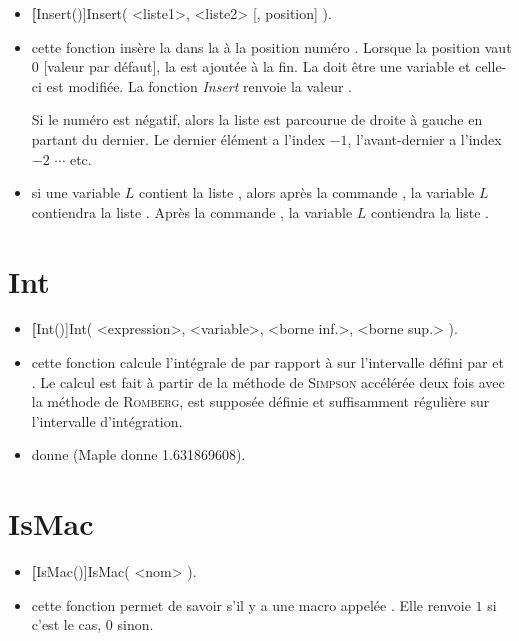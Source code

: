 \begin{itemize}
 \item \util \textbf[Insert()]{Insert( <liste1>, <liste2> [, position] )}.
 \item \desc cette fonction insère la  dans la  à la position numéro . Lorsque la position vaut 0 [valeur par défaut], la  est ajoutée à la fin. La  doit être une variable et celle-ci est modifiée. La fonction \textsl{Insert} renvoie la valeur \Nil.
 
  Si le numéro  est négatif, alors la liste est parcourue de droite à gauche en partant du dernier. Le dernier élément a l'index $-1$, l'avant-dernier a l'index $-2$ $\cdots$ etc.
  
 \item \exem si une variable $L$ contient la liste \co{[1,4,5]}, alors après la commande , la variable $L$ contiendra la liste \res{[1,2,3,4,5]}. Après la commande , la variable $L$ contiendra la liste \res{[1,4,2,3,5]}.
\end{itemize}

\section{Int}\label{cmdInt}

\begin{itemize}
 \item \util \textbf[Int()]{Int( <expression>, <variable>, <borne inf.>, <borne sup.> )}.
 \item \desc cette fonction calcule l'intégrale de  par rapport à  sur l'intervalle  défini par  et . Le calcul est fait à partir de la méthode de \textsc{Simpson} accélérée deux fois avec la méthode de \textsc{Romberg},  est supposée définie et suffisamment régulière sur l'intervalle d'intégration.
 \item \exem {} donne  (Maple donne 1.631869608).
\end{itemize}

\section{IsMac}\label{cmdIsMac}

\begin{itemize}
 \item \util \textbf[IsMac()]{IsMac( <nom> )}.
 \item \desc cette fonction permet de savoir s'il y a une macro appelée . Elle renvoie $1$ si c'est le cas, $0$ sinon.
\end{itemize}

